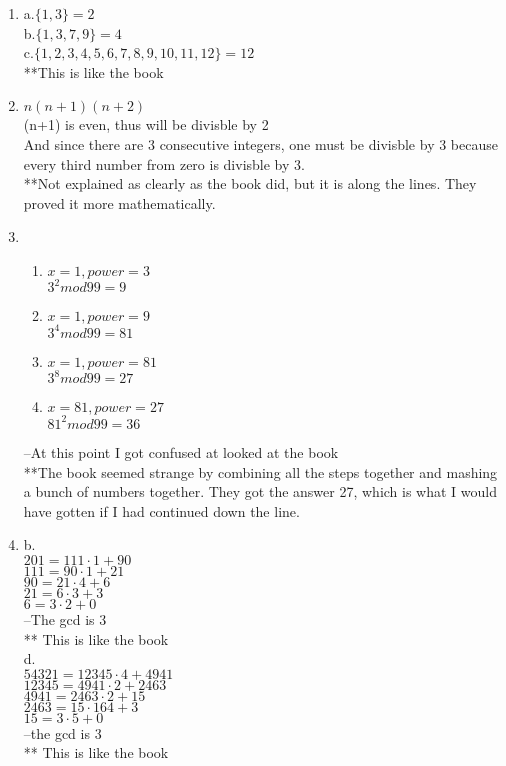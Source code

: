\documentclass{article}
\begin{document}
\begin{enumerate}
\item
	a.$\{1,3\} = 2$ \\
	b.$\{1,3,7,9\} = 4$ \\
	c.$\{1,2,3,4,5,6,7,8,9,10,11,12\} = 12$ \\
	**This is like the book

\item $n(n+1)(n+2)$ \\
			(n+1) is even, thus will be divisble by 2 \\
			And since there are 3 consecutive integers, one must be divisble by 3 because every third number from zero is divisble by 3. \\
			**Not explained as clearly as the book did, but it is along the lines. They proved it more mathematically.

\item 
	\begin{enumerate}
	\item $ x=1, power=3$ \\
				$3^2 mod 99 = 9$ 
	\item $x=1, power=9$ \\
 				$3^4 mod99=81$ 
	\item $x=1, power=81$ \\
				$3^8mod99=27$ 
	\item $x=81, power=27$ \\
				$81^2 mod 99 = 36$ 
	\end{enumerate}
			--At this point I got confused at looked at the book \\
			**The book seemed strange by combining all the steps together and mashing a bunch of numbers together. They got the answer 27, which is what I would have gotten if I had continued down the line.

\item
	b.\\
		$201 = 111 \cdot 1 +90$ \\
		$111 = 90 \cdot 1 + 21$ \\
		$90 = 21 \cdot 4 + 6$ \\
		$21 = 6 \cdot 3 + 3$ \\
		$6 = 3 \cdot 2 + 0$ \\
		--The gcd is 3 \\
		** This is like the book\\

	d.\\
		$54321 = 12345 \cdot 4 +4941$ \\
		$12345 = 4941 \cdot 2 +2463$ \\
		$4941 = 2463 \cdot 2 +15$ \\
		$2463 = 15 \cdot 164 + 3$ \\
		$15 = 3 \cdot 5 + 0$ \\
		--the gcd is 3 \\
		** This is like the book \\


\end{enumerate}
\end{document}
